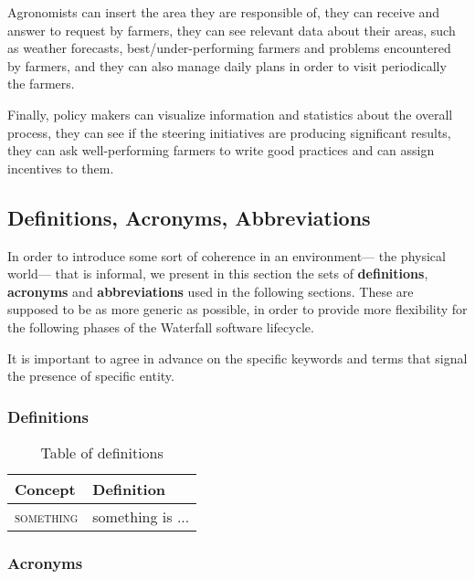 Agronomists can insert the area they are responsible of, they can receive and answer to request by farmers, they can see relevant data about their areas, such as weather forecasts, best/under-performing farmers and problems encountered by farmers, and they can also manage daily plans in order to visit periodically the farmers.

Finally, policy makers can visualize information and statistics about the overall process, they can see if the steering initiatives are producing significant results, they can ask well-performing farmers to write good practices and can assign incentives to them.



\subsection{Definitions, Acronyms, Abbreviations}
\label{sec:def_acr_abr}
In order to introduce some sort of coherence in an environment--- the physical world--- that is informal, we present in this section the sets of \textbf{definitions}, \textbf{acronyms} and \textbf{abbreviations} used in the following sections. These are supposed to be as more generic as possible, in order to provide more flexibility for the following phases of the Waterfall software lifecycle.

It is important to agree in advance on the specific keywords and terms that signal the presence of specific entity. 

\subsubsection{Definitions}
\label{sec:definitions}
\begin{table}[H]
    \setlength\arrayrulewidth{1pt}
    \centering
    \begin{tabular}{|m{}|m{}|}
        \rowcolor{myblue}
        \hline
        \color{white}Concept & \color{white}Definition \\
        \hline
        \textsc{something}     &   something is ... \\
        \hline
    \end{tabular}
    
    \caption{\label{tab:def}Table of definitions}
    
\end{table}

\subsubsection{Acronyms}
\label{sec:acronyms}

